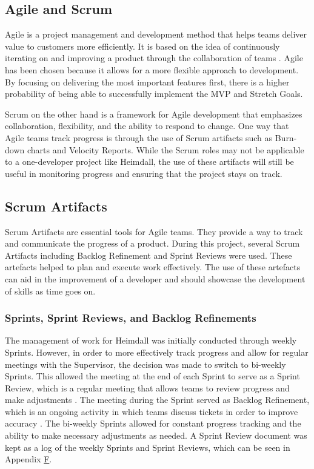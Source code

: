 \documentclass{article}
\begin{document}
\subsection{Agile and Scrum} \label{agile}

Agile is a project management and development method that helps teams deliver value to customers more efficiently. It is based on the idea of continuously iterating on and improving a product through the collaboration of teams \cite{what-is-agile}. Agile has been chosen because it allows for a more flexible approach to development. By focusing on delivering the most important features first, there is a higher probability of being able to successfully implement the MVP and Stretch Goals. \\\par Scrum on the other hand is a framework for Agile development that emphasizes collaboration, flexibility, and the ability to respond to change. One way that Agile teams track progress is through the use of Scrum artifacts such as Burn-down charts and Velocity Reports. While the Scrum roles may not be applicable to a one-developer project like Heimdall, the use of these artifacts will still be useful in monitoring progress and ensuring that the project stays on track.


\subsection{Scrum Artifacts} \label{artifacts}

Scrum Artifacts are essential tools for Agile teams. They provide a way to track and communicate the progress of a product. During this project, several Scrum Artifacts including Backlog Refinement and Sprint Reviews were used. These artefacts helped to plan and execute work effectively. The use of these artefacts can aid in the improvement of a developer and should showcase the development of skills as time goes on.

\subsubsection{Sprints, Sprint Reviews, and Backlog Refinements}

The management of work for Heimdall was initially conducted through weekly Sprints. However, in order to more effectively track progress and allow for regular meetings with the Supervisor, the decision was made to switch to bi-weekly Sprints. This allowed the meeting at the end of each Sprint to serve as a Sprint Review, which is a regular meeting that allows teams to review progress and make adjustments \cite{scrum-guides}. The meeting during the Sprint served as Backlog Refinement, which is an ongoing activity in which teams discuss tickets in order to improve accuracy \cite{scrum-guides}. The bi-weekly Sprints allowed for constant progress tracking and the ability to make necessary adjustments as needed. A Sprint Review document was kept as a log of the weekly Sprints and Sprint Reviews, which can be seen in Appendix \hyperlink{appendix-f}{F}.
\end{document}
